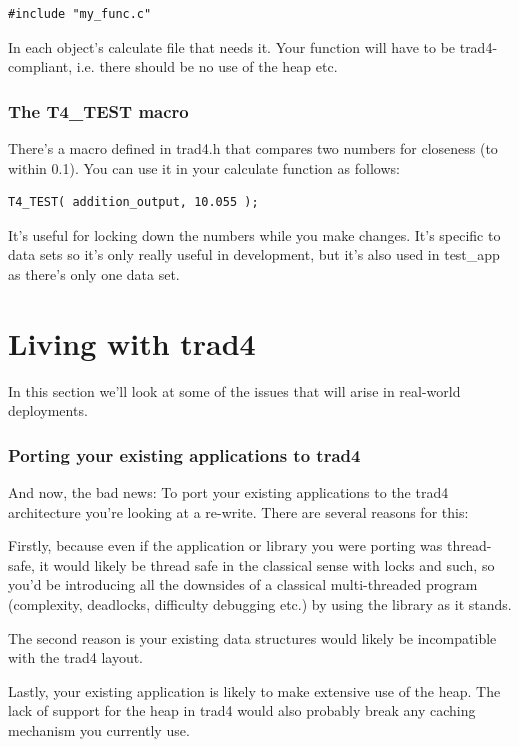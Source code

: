 \documentclass{report}
\begin{document}
\begin{verbatim}
#include "my_func.c"
\end{verbatim}

In each object's calculate file that needs it. Your function will have to be trad4-compliant, i.e. there should be no use of the heap etc. 

\subsection{The T4_TEST macro}

There's a macro defined in trad4.h that compares two numbers for closeness (to within 0.1). You can use it in your calculate function as follows:

\begin{verbatim}
T4_TEST( addition_output, 10.055 );
\end{verbatim}

It's useful for locking down the numbers while you make changes. It's specific to data sets so it's only really useful in development, but it's also used in test_app as there's only one data set.

\chapter{Living with trad4}

In this section we'll look at some of the issues that will arise in real-world deployments.

\subsection{Porting your existing applications to trad4}

And now, the bad news: To port your existing applications to the trad4 architecture you're looking at a re-write. There are several reasons for this:

Firstly, because even if the application or library you were porting was thread-safe, it would likely be thread safe in the classical sense with locks and such, so you'd be introducing all the downsides of a classical multi-threaded program (complexity, deadlocks, difficulty debugging etc.) by using the library as it stands.

The second reason is your existing data structures would likely be incompatible with the trad4 
layout.

Lastly, your existing application is likely to make extensive use of the heap. The lack of support for the heap in trad4 would also probably break any caching mechanism you currently use.
\end{document}
